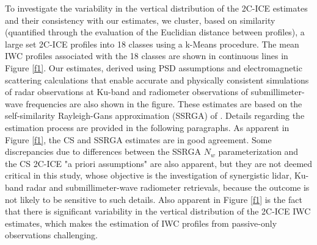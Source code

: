 \documentclass{ametsocV6.1}
\begin{document}
To investigate the variability in the vertical distribution of the 2C-ICE estimates and their consistency with our estimates, 
we cluster, based on similarity  (quantified through the evaluation of the Euclidian distance between profiles), 
a large set 2C-ICE profiles into 18 classes using a k-Means 
procedure. The mean IWC profiles associated with the 18 classes are shown in continuous lines in Figure \ref{f1}.  
Our estimates, derived using PSD assumptions and electromagnetic scattering calculations that enable 
accurate and physically consistent simulations of radar observations at Ku-band and radiometer observations of 
submillimeter-wave frequencies are also shown in the figure. These estimates are based on the self-similarity 
Rayleigh-Gans approximation (SSRGA) of \cite{hogan2017ssrga}. Details regarding the
estimation process are provided in the following paragraphs.  As apparent in Figure \ref{f1}, the CS and SSRGA estimates are in good 
agreement.  Some discrepancies due to differences between the SSRGA $N_w$ parameterization and the CS 2C-ICE 
"a priori assumptions" are also apparent, but they are not deemed critical in this study, whose objective is 
the investigation of synergistic lidar, Ku-band radar and submillimeter-wave radiometer retrievals, because the 
outcome is not likely to be sensitive to such details. Also apparent in Figure \ref{f1} is the fact that there is significant
variability in the vertical distribution of the 2C-ICE IWC estimates, which makes the estimation of IWC profiles from passive-only 
observations challenging.  
\end{document}
